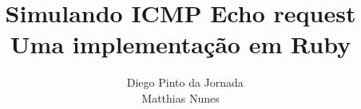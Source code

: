 \documentclass{acm_proc_article-sp}
\begin{document}
\makeatletter
\def\@copyrightspace{\relax}
\makeatother

\title{Simulando ICMP Echo request \\ Uma implementação em Ruby}

\author{\
\alignauthor
Diego Pinto da Jornada\\
\alignauthor
Matthias Nunes\\
}

\maketitle








\end{document}
